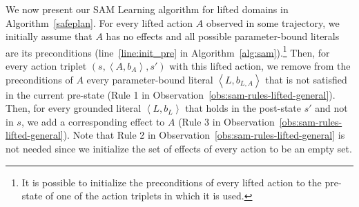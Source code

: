 \documentclass{article}
\newtheorem{theorem}{Theorem}
\newcommand{\tuple}[1]{\ensuremath{\left \langle #1 \right \rangle }}
\newcommand{\params}{\textit{params}}
\newcommand{\liftl}{L}
\newcommand{\lifta}{A}
\begin{document}
We now present our SAM Learning algorithm for lifted domains in Algorithm~\ref{safeplan}. 
For every lifted action $\lifta$ observed in some trajectory, 
we initially assume that $\lifta$ has no effects and all possible parameter-bound literals are its preconditions (line~\ref{line:init_pre} in Algorithm~\ref{alg:sam}).\footnote{It is possible %
to initialize the preconditions of every lifted action %
to the pre-state of one of the action triplets in which it is used.}  
Then, for every action triplet $(s, \tuple{\lifta, b_\lifta}, s')$ with this lifted action, we remove from the preconditions of $\lifta$ every parameter-bound literal $\tuple{\liftl, b_{\liftl,\lifta}}$ that is not satisfied in the current pre-state (Rule 1 in Observation~\ref{obs:sam-rules-lifted-general}). 
Then, for every grounded literal $\tuple{\liftl, b_\liftl}$ that holds in the post-state $s'$ and not in $s$, we add a corresponding effect to $\lifta$ (Rule 3 in Observation~\ref{obs:sam-rules-lifted-general}). 
Note that Rule 2 in Observation~\ref{obs:sam-rules-lifted-general} is not needed since we initialize the set of effects of every action to be an empty set. 
\end{document}
